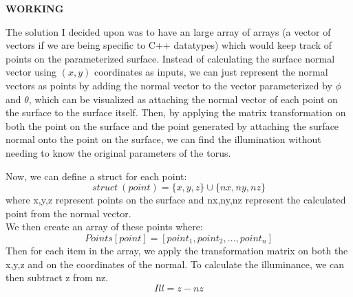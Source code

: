 \documentclass{article}
\begin{document}
\begin{flushleft}
\textbf{WORKING} \\
\end{flushleft}

\begin{flushleft}
The solution I decided upon was to have an large array of arrays (a vector of vectors if we are being specific to C++ datatypes) which would keep track of points on the parameterized surface. Instead of calculating the surface normal vector using $(x,y)$ coordinates as inputs, we can just represent the normal vectors as points by adding the normal vector to the vector parameterized by $\phi$ and $\theta$, which can be visualized as attaching the normal vector of each point on the surface to the surface itself. Then, by applying the matrix transformation on both the point on the surface and the point generated by attaching the surface normal onto the point on the surface, we can find the illumination without needing to know the original parameters of the torus.
\end{flushleft}

\begin{flushleft}
Now, we can define a struct for each point:
$$struct\ (point) = \{x,y,z\} \cup \{nx,ny,nz\}$$
where x,y,z represent points on the surface and nx,ny,nz represent the calculated point from the normal vector. \\
We then create an array of these points where:
$$Points[point] = [point_1, point_2, \ldots ,point_n]$$
Then for each item in the array, we apply the transformation matrix on both the x,y,z and on the coordinates of the normal. To calculate the illuminance, we can then subtract z from nz. $$Ill = z - nz$$ 
\end{flushleft}
\end{document}
